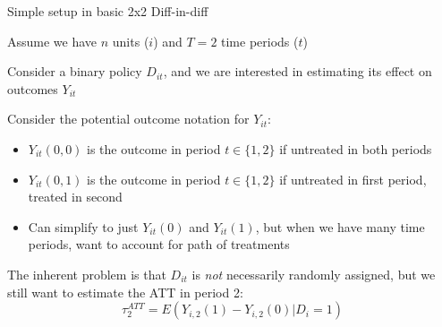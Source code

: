 \documentclass[notes,11pt, aspectratio=169]{beamer}
\newenvironment{wideitemize}{\itemize\addtolength{\itemsep}{10pt}}{\enditemize}
\begin{document}
\begin{frame}{Simple setup in basic 2x2 Diff-in-diff }
  \begin{wideitemize}
  \item Assume we have $n$ units ($i$) and $T=2$ time periods ($t$) 
  \item Consider a binary policy $D_{it}$, and we are interested
    in estimating its effect on outcomes $Y_{it}$
  \item Consider the potential outcome notation for $Y_{it}$:
    \begin{itemize}
    \item $Y_{it}(0,0)$ is the outcome in period $t\in \{1,2\}$ if untreated in both periods
    \item $Y_{it}(0,1)$ is the outcome in period $t\in \{1,2\}$ if
      untreated in first period, treated in second
    \item Can simplify to just $Y_{it}(0)$ and $Y_{it}(1)$, but when
      we have many time periods, want to account for path of treatments
    \end{itemize}
  \item The inherent problem is that $D_{it}$ is \emph{not}
    necessarily randomly assigned, but we still want to estimate the ATT in period 2:
    \begin{equation*}
      \tau_{2}^{ATT} = E(Y_{i,2}(1) - Y_{i,2}(0) | D_{i} = 1)
    \end{equation*}
  \end{wideitemize}
\end{frame}
\end{document}
